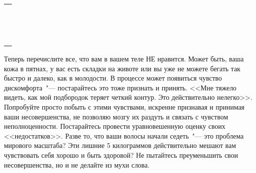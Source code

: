 \setlength{\extrarowheight}{2mm}
\begin{tabularx}{\textwidth}{X}
	\\
	\arrayrulecolor{gray}\hline\\
	\hline\\
	\hline\\
	\hline\\
	\hline\\
	\hline\\	
	\hline\\
	\hline\\
	\hline\\
	\hline\\
	\hline\\
	\hline\\
	\hline\\
	\hline\\
	\hline\\
\end{tabularx}
\setlength{\extrarowheight}{0mm}
\begin{itemize}
	\itemWritingHand Теперь перечислите все, что вам в вашем теле НЕ нравится. Может быть, ваша кожа в пятнах, у вас есть складки на животе или вы уже не можете бегать так быстро и далеко, как в молодости. В процессе может появиться чувство дискомфорта~"--- постарайтесь это тоже признать и принять. <<Мне тяжело видеть, как мой подбородок теряет четкий контур. Это действительно нелегко>>. Попробуйте просто побыть с этими чувствами, искренне признавая и принимая ваши несовершенства, не позволяю мозгу их раздуть и связать с чувством неполноценности. Постарайтесь провести уравновешенную оценку своих <<недостатков>>. Разве то, что ваши волосы начали седеть~"--- это проблема мирового масштаба? Эти лишние 5 килограммов действительно мешают вам чувствовать себя хорошо и быть здоровой? Не пытайтесь преуменьшить свои несовершенства, но и не делайте из мухи слова. 
\end{itemize}

